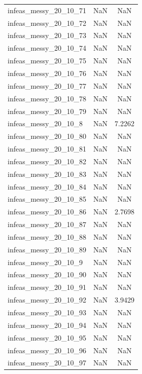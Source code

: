 \begin{longtable}{lcc}
infeas\_messy\_20\_10\_71  &      NaN &     NaN \\
infeas\_messy\_20\_10\_72  &      NaN &     NaN \\
infeas\_messy\_20\_10\_73  &      NaN &     NaN \\
infeas\_messy\_20\_10\_74  &      NaN &     NaN \\
infeas\_messy\_20\_10\_75  &      NaN &     NaN \\
infeas\_messy\_20\_10\_76  &      NaN &     NaN \\
infeas\_messy\_20\_10\_77  &      NaN &     NaN \\
infeas\_messy\_20\_10\_78  &      NaN &     NaN \\
infeas\_messy\_20\_10\_79  &      NaN &     NaN \\
infeas\_messy\_20\_10\_8   &      NaN &  7.2262 \\
infeas\_messy\_20\_10\_80  &      NaN &     NaN \\
infeas\_messy\_20\_10\_81  &      NaN &     NaN \\
infeas\_messy\_20\_10\_82  &      NaN &     NaN \\
infeas\_messy\_20\_10\_83  &      NaN &     NaN \\
infeas\_messy\_20\_10\_84  &      NaN &     NaN \\
infeas\_messy\_20\_10\_85  &      NaN &     NaN \\
infeas\_messy\_20\_10\_86  &      NaN &  2.7698 \\
infeas\_messy\_20\_10\_87  &      NaN &     NaN \\
infeas\_messy\_20\_10\_88  &      NaN &     NaN \\
infeas\_messy\_20\_10\_89  &      NaN &     NaN \\
infeas\_messy\_20\_10\_9   &      NaN &     NaN \\
infeas\_messy\_20\_10\_90  &      NaN &     NaN \\
infeas\_messy\_20\_10\_91  &      NaN &     NaN \\
infeas\_messy\_20\_10\_92  &      NaN &  3.9429 \\
infeas\_messy\_20\_10\_93  &      NaN &     NaN \\
infeas\_messy\_20\_10\_94  &      NaN &     NaN \\
infeas\_messy\_20\_10\_95  &      NaN &     NaN \\
infeas\_messy\_20\_10\_96  &      NaN &     NaN \\
infeas\_messy\_20\_10\_97  &      NaN &     NaN \\

\end{longtable}
